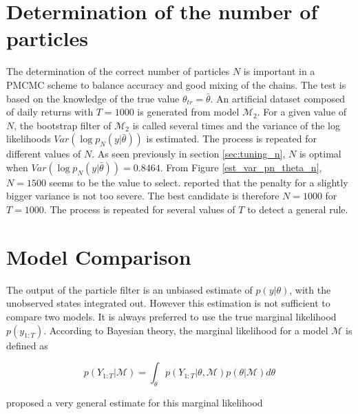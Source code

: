\documentclass[11pt,a4,twosided,singlespacing,titlepagenumber=on]{scrreprt}
\numberwithin{equation}{chapter} %
\theoremstyle{remark}
\begin{document}
\section{Determination of the number of particles}
The determination of the correct number of particles $N$ is important in a PMCMC scheme to balance accuracy and good mixing of the chains. The test is based on the knowledge of the true value $\theta_{tr} = \bar{\theta}$. An artificial dataset composed of daily returns with $T=1000$ is generated from model $\mathcal{M}_2$. For a given value of $N$, the bootstrap filter of $\mathcal{M}_2$ is called several times and the variance of the log likelihoods $Var(\log p_N(y|\bar{\theta}))$ is estimated. The process is repeated for different values of $N$. As seen previously in section \ref{sec:tuning_n}, $N$ is optimal when $Var(\log p_N(y|\bar{\theta})) = 0.8464$. From Figure \ref{est_var_pn_theta_n}, $N = 1500$ seems to be the value to select. \cite{pitt2012} reported that the penalty for a slightly bigger variance is not too severe. The best candidate is therefore $N = 1000$ for $T=1000$. The process is repeated for several values of $T$ to detect a general rule.

\section{Model Comparison}
The output of the particle filter is an unbiased estimate of $p(y|\theta)$, with the unobserved states integrated out. However this estimation is not sufficient to compare two models. It is always preferred to use the true marginal likelihood $p(y_{1:T})$. According to Bayesian theory, the marginal likelihood for a model $\mathcal{M}$ is defined as

$$p(Y_{1:T} | \mathcal{M}) = \int_{\theta} p(Y_{1:T} | \theta, \mathcal{M}) p(\theta | \mathcal{M}) d\theta$$

\noindent
\cite{gelfand1994} proposed a very general estimate for this marginal likelihood
\end{document}
